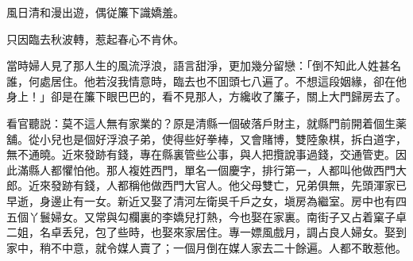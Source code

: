 \begin{myquote}
風日清和漫出遊，偶従簾下識嬌羞。

只因臨去秋波轉，惹起春心不肯休。
\end{myquote}

當時婦人見了那人生的風流浮浪，語言甜淨，更加幾分留戀：「倒不知此人姓甚名誰，何處居住。他若沒我情意時，臨去也不囬頭七八遍了。不想這段姻緣，卻在他身上！」卻是在簾下眼巴巴的，看不見那人，方纔收了簾子，關上大門歸房去了。

看官聽説：莫不這人無有家業的？原是清縣一個破落戶財主，就縣門前開着個生薬舖。從小兒也是個好浮浪子弟，使得些好拳棒，又會賭博，雙陸象棋，拆白道字，無不通曉。近來發跡有錢，專在縣裏管些公事，與人把攬說事過錢，交通管吏。因此滿縣人都懼怕他。那人複姓西門，單名一個慶字，排行第一，人都叫他做西門大郎。近來發跡有錢，人都稱他做西門大官人。他父母雙亡，兄弟俱無，先頭渾家已早逝，身邊止有一女。新近又娶了清河左衛吳千戶之女，塡房為繼室。房中也有四五個丫鬟婦女。又常與勾欄裏的李嬌兒打熱，今也娶在家裏。南街子又占着窠子卓二姐，名卓丢兒，包了些時，也娶來家居住。專一嫖風戲月，調占良人婦女。娶到家中，稍不中意，就令媒人賣了；一個月倒在媒人家去二十餘遍。人都不敢惹他。

